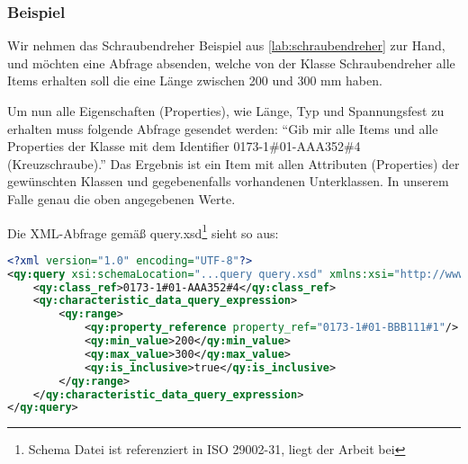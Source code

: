 \subsubsection{Beispiel}

Wir nehmen das Schraubendreher Beispiel aus \autoref{lab:schraubendreher} zur Hand, und möchten eine Abfrage absenden, welche von der Klasse Schraubendreher alle Items erhalten soll die eine Länge zwischen 200 und 300 mm haben. 

Um nun alle Eigenschaften (Properties), wie Länge, Typ und Spannungsfest zu erhalten muss folgende Abfrage gesendet werden: 
\enquote{Gib mir alle Items und alle Properties der Klasse mit dem Identifier 0173-1\#01-AAA352\#4 (Kreuzschraube).}
Das Ergebnis ist ein Item mit allen Attributen (Properties) der gewünschten Klassen und gegebenenfalls vorhandenen Unterklassen. In unserem Falle genau die oben angegebenen Werte.

Die XML-Abfrage gemäß query.xsd\footnote{Schema Datei ist referenziert in ISO 29002-31, liegt der Arbeit bei} sieht so aus:

\begin{lstlisting}[caption=Query Beispiel - Daten mit Suchausdruck abfragen, language=XML, label=lst:UseCaseDatenabfragenAnhang]
<?xml version="1.0" encoding="UTF-8"?>
<qy:query xsi:schemaLocation="...query query.xsd" xmlns:xsi="http://www.w3.org/2001/XMLSchema-instance" xmlns:cat="...catalogue" xmlns:val="...value" xmlns:qy="...query" xmlns:bas="...basic">
	<qy:class_ref>0173-1#01-AAA352#4</qy:class_ref>
	<qy:characteristic_data_query_expression>
		<qy:range>
			<qy:property_reference property_ref="0173-1#01-BBB111#1"/>
			<qy:min_value>200</qy:min_value>
			<qy:max_value>300</qy:max_value>
			<qy:is_inclusive>true</qy:is_inclusive>
		</qy:range>
	</qy:characteristic_data_query_expression>
</qy:query>
\end{lstlisting}



